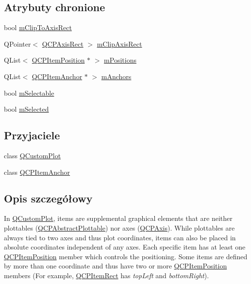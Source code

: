 \subsection*{Atrybuty chronione}
\begin{DoxyCompactItemize}
\item 
bool \hyperlink{class_q_c_p_abstract_item_ad2a70ff6b658fcb84a9427f69d3f587d}{m\+Clip\+To\+Axis\+Rect}
\item 
Q\+Pointer$<$ \hyperlink{class_q_c_p_axis_rect}{Q\+C\+P\+Axis\+Rect} $>$ \hyperlink{class_q_c_p_abstract_item_a3e57cfe7da4b1ac3d6fa7281ea437361}{m\+Clip\+Axis\+Rect}
\item 
Q\+List$<$ \hyperlink{class_q_c_p_item_position}{Q\+C\+P\+Item\+Position} $\ast$ $>$ \hyperlink{class_q_c_p_abstract_item_af94ff71b6a15ea6d028ab8bd8eccd012}{m\+Positions}
\item 
Q\+List$<$ \hyperlink{class_q_c_p_item_anchor}{Q\+C\+P\+Item\+Anchor} $\ast$ $>$ \hyperlink{class_q_c_p_abstract_item_a909a3abab783de302ebf0a0e6f2bbc15}{m\+Anchors}
\item 
bool \hyperlink{class_q_c_p_abstract_item_ad81eb35c8726a0f458db9df9732e0e41}{m\+Selectable}
\item 
bool \hyperlink{class_q_c_p_abstract_item_a4bdb3457dad1d268c0f78a44152b9645}{m\+Selected}
\end{DoxyCompactItemize}
\subsection*{Przyjaciele}
\begin{DoxyCompactItemize}
\item 
class \hyperlink{class_q_c_p_abstract_item_a1cdf9df76adcfae45261690aa0ca2198}{Q\+Custom\+Plot}
\item 
class \hyperlink{class_q_c_p_abstract_item_a61767d414fd57af9eb1741b34268c7fc}{Q\+C\+P\+Item\+Anchor}
\end{DoxyCompactItemize}


\subsection{Opis szczegółowy}
In \hyperlink{class_q_custom_plot}{Q\+Custom\+Plot}, items are supplemental graphical elements that are neither plottables (\hyperlink{class_q_c_p_abstract_plottable}{Q\+C\+P\+Abstract\+Plottable}) nor axes (\hyperlink{class_q_c_p_axis}{Q\+C\+P\+Axis}). While plottables are always tied to two axes and thus plot coordinates, items can also be placed in absolute coordinates independent of any axes. Each specific item has at least one \hyperlink{class_q_c_p_item_position}{Q\+C\+P\+Item\+Position} member which controls the positioning. Some items are defined by more than one coordinate and thus have two or more \hyperlink{class_q_c_p_item_position}{Q\+C\+P\+Item\+Position} members (For example, \hyperlink{class_q_c_p_item_rect}{Q\+C\+P\+Item\+Rect} has {\itshape top\+Left} and {\itshape bottom\+Right}).

